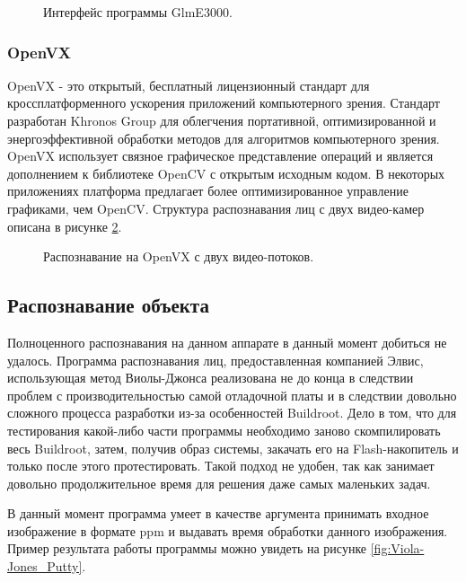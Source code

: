 \documentclass[14pt,a4paper]{scrartcl}
\begin{document}
			\begin{figure}[h]
				\caption{Интерфейс программы GlmE3000.}
				\label{fig:Glme_3000}
			\end{figure}
		
		\subsubsection{OpenVX}
		
			OpenVX - это открытый, бесплатный лицензионный стандарт для кроссплатформенного ускорения приложений компьютерного зрения. Стандарт разработан Khronos Group для облегчения портативной, оптимизированной и энергоэффективной обработки методов для алгоритмов компьютерного зрения. OpenVX использует связное графическое представление операций и является дополнением к библиотеке OpenCV с открытым исходным кодом. В некоторых приложениях платформа предлагает более оптимизированное управление графиками, чем OpenCV\cite{bib:OpenVX_Wikipedia}. Структура распознавания лиц с двух видео-камер описана в рисунке \ref{fig:Stereo_Vision_OpenVX}\cite{bib:OpenVX_Habr}.
			
			\begin{figure}[h]
				\caption{Распознавание на OpenVX с двух видео-потоков.}
				\label{fig:Stereo_Vision_OpenVX}
			\end{figure}
			
	
	\subsection{Распознавание объекта}
	
		Полноценного распознавания на данном аппарате в данный момент добиться не удалось. Программа распознавания лиц, предоставленная компанией Элвис, использующая метод Виолы-Джонса реализована не до конца в следствии проблем с производительностью самой отладочной платы и в следствии довольно сложного процесса разработки из-за особенностей Buildroot. Дело в том, что для тестирования какой-либо части программы необходимо заново скомпилировать весь Buildroot, затем, получив образ системы, закачать его на Flash-накопитель и только после этого протестировать. Такой подход не удобен, так как занимает довольно продолжительное время для решения даже самых маленьких задач.
		
		В данный момент программа умеет в качестве аргумента принимать входное изображение в формате ppm и выдавать время обработки данного изображения. Пример результата работы программы можно увидеть на рисунке \ref{fig:Viola-Jones_Putty}.
		
\end{document}
